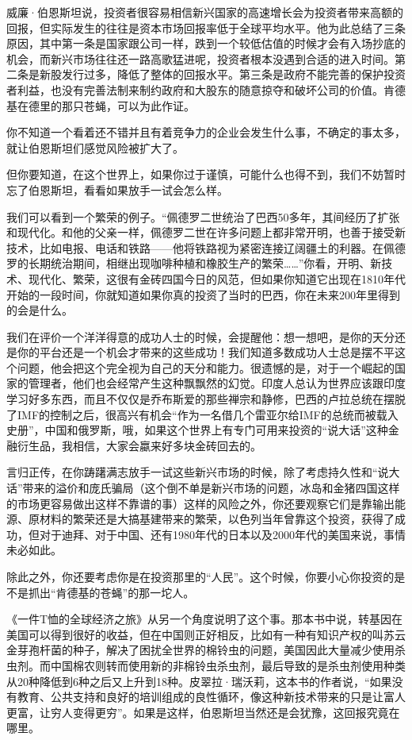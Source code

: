 威廉·伯恩斯坦说，投资者很容易相信新兴国家的高速增长会为投资者带来高额的回报，但实际发生的往往是资本市场回报率低于全球平均水平。他为此总结了三条原因，其中第一条是国家跟公司一样，跌到一个较低估值的时候才会有入场抄底的机会，而新兴市场往往还一路高歌猛进呢，投资者根本没遇到合适的进入时间。第二条是新股发行过多，降低了整体的回报水平。第三条是政府不能完善的保护投资者利益，也没有完善法制来制约政府和大股东的随意掠夺和破坏公司的价值。肯德基在德里的那只苍蝇，可以为此作证。

你不知道一个看着还不错并且有着竞争力的企业会发生什么事，不确定的事太多，就让伯恩斯坦们感觉风险被扩大了。

但你要知道，在这个世界上，如果你过于谨慎，可能什么也得不到，我们不妨暂时忘了伯恩斯坦，看看如果放手一试会怎么样。

我们可以看到一个繁荣的例子。``佩德罗二世统治了巴西50多年，其间经历了扩张和现代化。和他的父亲一样，佩德罗二世在许多问题上都非常开明，也善于接受新技术，比如电报、电话和铁路------他将铁路视为紧密连接辽阔疆土的利器。在佩德罗的长期统治期间，相继出现咖啡种植和橡胶生产的繁荣\ldots\ldots{}''你看，开明、新技术、现代化、繁荣，这很有金砖四国今日的风范，但如果你知道它出现在1810年代开始的一段时间，你就知道如果你真的投资了当时的巴西，你在未来200年里得到的会是什么。

我们在评价一个洋洋得意的成功人士的时候，会提醒他：想一想吧，是你的天分还是你的平台还是一个机会才带来的这些成功！我们知道多数成功人士总是摆不平这个问题，他会把这个完全视为自己的天分和能力。很遗憾的是，对于一个崛起的国家的管理者，他们也会经常产生这种飘飘然的幻觉。印度人总认为世界应该跟印度学习好多东西，而且不仅仅是乔布斯爱的那些禅宗和静修，巴西的卢拉总统在摆脱了IMF的控制之后，很高兴有机会``作为一名借几个雷亚尔给IMF的总统而被载入史册''，中国和俄罗斯，哦，如果这个世界上有专门可用来投资的``说大话''这种金融衍生品，我相信，大家会蠃来好多块金砖回去的。

言归正传，在你踌躇满志放手一试这些新兴市场的时候，除了考虑持久性和``说大话''带来的溢价和庞氏骗局（这个倒不单是新兴市场的问题，冰岛和金猪四国这样的市场更容易做出这样不靠谱的事）这样的风险之外，你还要观察它们是靠输出能源、原材料的繁荣还是大搞基建带来的繁荣，以色列当年曾靠这个投资，获得了成功，但对于迪拜、对于中国、还有1980年代的日本以及2000年代的美国来说，事情未必如此。

除此之外，你还要考虑你是在投资那里的``人民''。这个时候，你要小心你投资的是不是抓出``肯德基的苍蝇''的那一坨人。

《一件T恤的全球经济之旅》从另一个角度说明了这个事。那本书中说，转基因在美国可以得到很好的收益，但在中国则正好相反，比如有一种有知识产权的叫苏云金芽孢杆菌的种子，解决了困扰全世界的棉铃虫的问题，美国因此大量减少使用杀虫剂。而中国棉农则转而使用新的非棉铃虫杀虫剂，最后导致的是杀虫剂使用种类从20种降低到6种之后又上升到18种。皮翠拉·瑞沃莉，这本书的作者说，``如果没有教育、公共支持和良好的培训组成的良性循环，像这种新技术带来的只是让富人更富，让穷人变得更穷''。如果是这样，伯恩斯坦当然还是会犹豫，这回报究竟在哪里。

